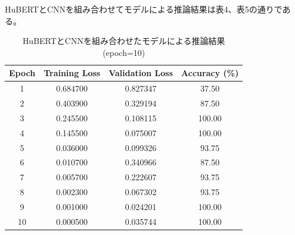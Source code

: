 \documentclass[10pt]{ltjsarticle}
\begin{document}
HuBERTとCNNを組み合わせてモデルによる推論結果は表4、表5の通りである。
\vspace{10pt}
\begin{table}[h]
\centering
\caption{HuBERTとCNNを組み合わせたモデルによる推論結果(epoch=10)}
\begin{tabular}{cccc}
\toprule
Epoch & Training Loss & Validation Loss & Accuracy (\%) \\
\midrule
1  & 0.684700 & 0.827347 & 37.50 \\
2  & 0.403900 & 0.329194 & 87.50 \\
3  & 0.245500 & 0.108115 & 100.00 \\
4  & 0.145500 & 0.075007 & 100.00 \\
5  & 0.036000 & 0.099326 & 93.75 \\
6  & 0.010700 & 0.340966 & 87.50 \\
7  & 0.005700 & 0.222607 & 93.75 \\
8  & 0.002300 & 0.067302 & 93.75 \\
9  & 0.001000 & 0.024201 & 100.00 \\
10 & 0.000500 & 0.035744 & 100.00 \\
\bottomrule
\end{tabular}
\end{table}
\end{document}
